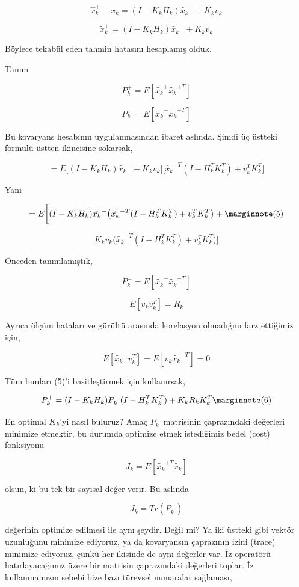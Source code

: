 \documentclass[12pt,fleqn]{article}\usepackage{../../common}
\begin{document}
$$ \hat{x}_k^+ - x_k =  (I - K_kH_k)\tilde{x_k}^- + K_kv_k   $$

$$ \tilde{x}_k^+ = (I - K_kH_k)\tilde{x_k}^- + K_kv_k   $$

Böylece tekabül eden tahmin hatasını hesaplamış olduk. 

Tanım

$$ P_k^+ = E[ \tilde{x_k}^+\tilde{x_k}^{+T} ]$$

$$ P_k^- = E[ \tilde{x_k}^- \tilde{x_k}^{-T} ]$$

Bu kovaryans hesabının uygulanmasından ibaret aslında. Şimdi üç üstteki formülü
üstten ikincisine sokarsak,

$$ =  E \big[ (I - K_kH_k)\tilde{x_k}^- + K_kv_k \big] \big[\tilde{x_k}^{-T}(I - H_k^TK_k^T) + v_k^TK_k^T \big] $$

Yani

$$ 
= E \bigg[ (I - K_kH_k)\tilde{x_k}^- \big( \tilde{x_k}^{-T}(I - H_k^TK_k^T)
+ v_k^TK_k^T \big) + 
\mlabel{5}
$$

$$ K_kv_k \big( \tilde{x_k}^{-T}(I - H_k^TK_k^T) + v_k^TK_k^T  \big) \bigg] $$

Önceden tanımlamıştık,

$$ P_k^- = E[ \tilde{x_k}^- \tilde{x_k}^{-T} ]$$

$$ E[v_kv_k^T] = R_k $$

Ayrıca ölçüm hataları ve gürültü arasında korelasyon olmadığını farz ettiğimiz
için,

$$ E[\tilde{x_k}^-v_k^T] = E[v_k\tilde{x_k}^{-T}] = 0 $$

Tüm bunları (5)'i basitleştirmek için kullanırsak,

$$ 
P_k^{+} =  (I - K_kH_k)P_k^-(I - H_k^TK_k^T) + K_kR_kK_k^T 
\mlabel{6}
$$

En optimal $K_k$'yi nasıl buluruz? Amaç $P_k^+$ matrisinin çaprazındaki
değerleri minimize etmektir, bu durumda optimize etmek istediğimiz bedel (cost)
fonksiyonu

$$ J_k = E[ \tilde{x_k}^{+T}\tilde{x_k} ] $$

olsun, ki bu tek bir sayısal değer verir. Bu aslında 

$$ J_k = Tr(P_k^+) $$

değerinin optimize edilmesi ile aynı şeydir. Değil mi? Ya iki üstteki gibi
vektör uzunluğunu minimize ediyoruz, ya da kovaryansın çaprazının izini (trace)
minimize ediyoruz, çünkü her ikisinde de aynı değerler var. İz operatörü
hatırlayacağımız üzere bir matrisin çaprazındaki değerleri toplar. İz
kullanmamızın sebebi bize bazı türevsel numaralar sağlaması,
\end{document}
